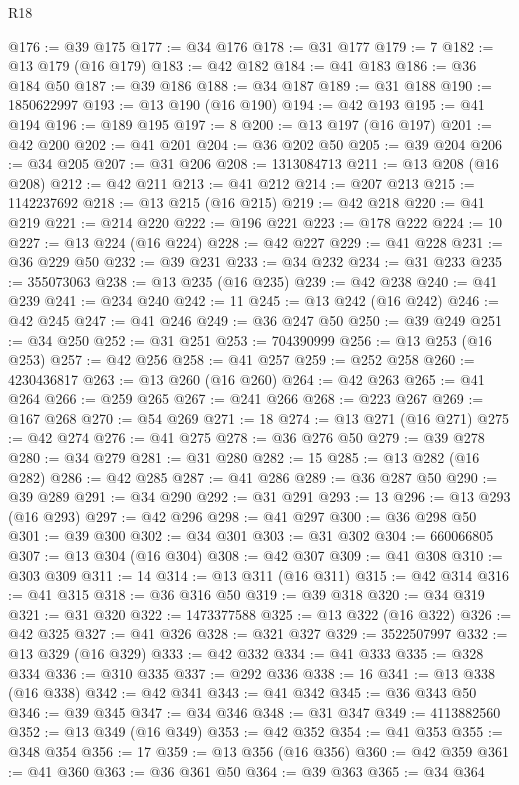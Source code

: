\begin{lexlean}{R18}
\begin{coremodule}
@176 := @39 @175
@177 := @34 @176
@178 := @31 @177
@179 := 7
@182 := @13 @179 (@16 @179)
@183 := @42 @182
@184 := @41 @183
@186 := @36 @184 @50
@187 := @39 @186
@188 := @34 @187
@189 := @31 @188
@190 := 1850622997
@193 := @13 @190 (@16 @190)
@194 := @42 @193
@195 := @41 @194
@196 := @189 @195
@197 := 8
@200 := @13 @197 (@16 @197)
@201 := @42 @200
@202 := @41 @201
@204 := @36 @202 @50
@205 := @39 @204
@206 := @34 @205
@207 := @31 @206
@208 := 1313084713
@211 := @13 @208 (@16 @208)
@212 := @42 @211
@213 := @41 @212
@214 := @207 @213
@215 := 1142237692
@218 := @13 @215 (@16 @215)
@219 := @42 @218
@220 := @41 @219
@221 := @214 @220
@222 := @196 @221
@223 := @178 @222
@224 := 10
@227 := @13 @224 (@16 @224)
@228 := @42 @227
@229 := @41 @228
@231 := @36 @229 @50
@232 := @39 @231
@233 := @34 @232
@234 := @31 @233
@235 := 355073063
@238 := @13 @235 (@16 @235)
@239 := @42 @238
@240 := @41 @239
@241 := @234 @240
@242 := 11
@245 := @13 @242 (@16 @242)
@246 := @42 @245
@247 := @41 @246
@249 := @36 @247 @50
@250 := @39 @249
@251 := @34 @250
@252 := @31 @251
@253 := 704390999
@256 := @13 @253 (@16 @253)
@257 := @42 @256
@258 := @41 @257
@259 := @252 @258
@260 := 4230436817
@263 := @13 @260 (@16 @260)
@264 := @42 @263
@265 := @41 @264
@266 := @259 @265
@267 := @241 @266
@268 := @223 @267
@269 := @167 @268
@270 := @54 @269
@271 := 18
@274 := @13 @271 (@16 @271)
@275 := @42 @274
@276 := @41 @275
@278 := @36 @276 @50
@279 := @39 @278
@280 := @34 @279
@281 := @31 @280
@282 := 15
@285 := @13 @282 (@16 @282)
@286 := @42 @285
@287 := @41 @286
@289 := @36 @287 @50
@290 := @39 @289
@291 := @34 @290
@292 := @31 @291
@293 := 13
@296 := @13 @293 (@16 @293)
@297 := @42 @296
@298 := @41 @297
@300 := @36 @298 @50
@301 := @39 @300
@302 := @34 @301
@303 := @31 @302
@304 := 660066805
@307 := @13 @304 (@16 @304)
@308 := @42 @307
@309 := @41 @308
@310 := @303 @309
@311 := 14
@314 := @13 @311 (@16 @311)
@315 := @42 @314
@316 := @41 @315
@318 := @36 @316 @50
@319 := @39 @318
@320 := @34 @319
@321 := @31 @320
@322 := 1473377588
@325 := @13 @322 (@16 @322)
@326 := @42 @325
@327 := @41 @326
@328 := @321 @327
@329 := 3522507997
@332 := @13 @329 (@16 @329)
@333 := @42 @332
@334 := @41 @333
@335 := @328 @334
@336 := @310 @335
@337 := @292 @336
@338 := 16
@341 := @13 @338 (@16 @338)
@342 := @42 @341
@343 := @41 @342
@345 := @36 @343 @50
@346 := @39 @345
@347 := @34 @346
@348 := @31 @347
@349 := 4113882560
@352 := @13 @349 (@16 @349)
@353 := @42 @352
@354 := @41 @353
@355 := @348 @354
@356 := 17
@359 := @13 @356 (@16 @356)
@360 := @42 @359
@361 := @41 @360
@363 := @36 @361 @50
@364 := @39 @363
@365 := @34 @364

\end{coremodule}
\end{lexlean}
